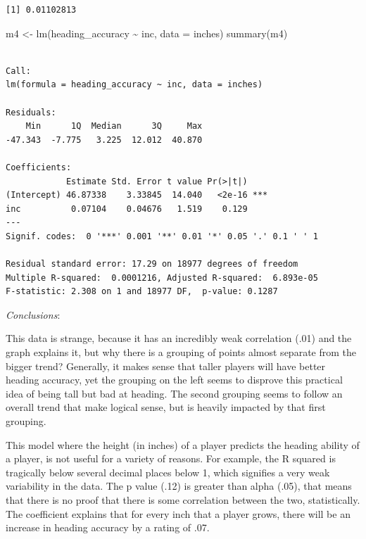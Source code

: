\documentclass[
  letterpaper,
  DIV=11,
  numbers=noendperiod]{scrartcl}
\newenvironment{Shaded}{\begin{snugshade}}{\end{snugshade}}
\newcommand{\AttributeTok}[1]{\textcolor[rgb]{0.40,0.45,0.13}{#1}}
\newcommand{\FunctionTok}[1]{\textcolor[rgb]{0.28,0.35,0.67}{#1}}
\newcommand{\NormalTok}[1]{\textcolor[rgb]{0.00,0.23,0.31}{#1}}
\newcommand{\OtherTok}[1]{\textcolor[rgb]{0.00,0.23,0.31}{#1}}
\newcommand{\SpecialCharTok}[1]{\textcolor[rgb]{0.37,0.37,0.37}{#1}}
\begin{document}
\begin{Shaded}
\end{Shaded}

\begin{verbatim}
[1] 0.01102813
\end{verbatim}

\begin{Shaded}
\begin{Highlighting}[]
\NormalTok{m4 }\OtherTok{\textless{}{-}} \FunctionTok{lm}\NormalTok{(heading\_accuracy }\SpecialCharTok{\textasciitilde{}}\NormalTok{ inc, }\AttributeTok{data =}\NormalTok{ inches)}
\FunctionTok{summary}\NormalTok{(m4)}
\end{Highlighting}
\end{Shaded}

\begin{verbatim}

Call:
lm(formula = heading_accuracy ~ inc, data = inches)

Residuals:
    Min      1Q  Median      3Q     Max 
-47.343  -7.775   3.225  12.012  40.870 

Coefficients:
            Estimate Std. Error t value Pr(>|t|)    
(Intercept) 46.87338    3.33845  14.040   <2e-16 ***
inc          0.07104    0.04676   1.519    0.129    
---
Signif. codes:  0 '***' 0.001 '**' 0.01 '*' 0.05 '.' 0.1 ' ' 1

Residual standard error: 17.29 on 18977 degrees of freedom
Multiple R-squared:  0.0001216, Adjusted R-squared:  6.893e-05 
F-statistic: 2.308 on 1 and 18977 DF,  p-value: 0.1287
\end{verbatim}

\emph{Conclusions}:

This data is strange, because it has an incredibly weak correlation
(.01) and the graph explains it, but why there is a grouping of points
almost separate from the bigger trend? Generally, it makes sense that
taller players will have better heading accuracy, yet the grouping on
the left seems to disprove this practical idea of being tall but bad at
heading. The second grouping seems to follow an overall trend that make
logical sense, but is heavily impacted by that first grouping.

This model where the height (in inches) of a player predicts the heading
ability of a player, is not useful for a variety of reasons. For
example, the R squared is tragically below several decimal places below
1, which signifies a very weak variability in the data. The p value
(.12) is greater than alpha (.05), that means that there is no proof
that there is some correlation between the two, statistically. The
coefficient explains that for every inch that a player grows, there will
be an increase in heading accuracy by a rating of .07.
\end{document}
